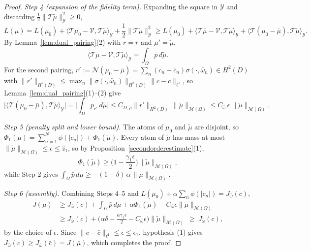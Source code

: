 \documentclass[11pt]{amsart}
\theoremstyle{definition}
\theoremstyle{remark}
\begin{document}
\begin{proof}
\emph{Step 4 (expansion of the fidelity term).} Expanding the square in
$\mathcal{Y}$ and discarding $\frac{1}{2}\|\mathcal{T}\tilde{\mu}\|_{\mathcal{Y}}^2 \ge 0$,
\begin{equation*}
	L(\mu)
	= L(\mu_0) + \langle \mathcal{T}\mu_0 - \mathcal{V}, \mathcal{T}\tilde{\mu} \rangle_{\mathcal{Y}}
	+ \frac{1}{2}\|\mathcal{T}\tilde{\mu}\|_{\mathcal{Y}}^2
	\ge L(\mu_0)
	+ \langle \mathcal{T}\bar{\mu} - \mathcal{V}, \mathcal{T}\tilde{\mu} \rangle_{\mathcal{Y}}
	+ \langle \mathcal{T}(\mu_0 - \bar{\mu}), \mathcal{T}\tilde{\mu} \rangle_{\mathcal{Y}} .
\end{equation*}
By Lemma~\ref{lem:dual_pairing}(2) with $r = \bar{r}$ and $\mu' = \tilde{\mu}$,
\begin{equation*}
	\langle \mathcal{T}\bar{\mu} - \mathcal{V}, \mathcal{T}\tilde{\mu} \rangle_{\mathcal{Y}}
	= \int_\Omega \bar{p} \, d\tilde{\mu} .
\end{equation*}
For the second pairing, $r' := \mathcal{N}(\mu_0 - \bar{\mu})
= \sum_n (c_n - \bar{c}_n) \sigma(\cdot, \bar{\omega}_n) \in H^2(D)$ with
$\|r'\|_{H^2(D)} \le \max_n \|\sigma(\cdot,\bar{\omega}_n)\|_{H^2(D)}
\|c - \bar{c}\|_{\ell^1}$, so Lemma~\ref{lem:dual_pairing}(1)--(2) give
\begin{equation*}
	\big| \langle \mathcal{T}(\mu_0 - \bar{\mu}), \mathcal{T}\tilde{\mu} \rangle_{\mathcal{Y}} \big|
	= \bigg| \int_\Omega p_{r'} \, d\tilde{\mu} \bigg|
	\le C_{D, \rho} \|r'\|_{H^2(D)} \, \|\tilde{\mu}\|_{\mathcal{M}(\Omega)}
	\le C_{\bar{\omega}} \, \epsilon \, \|\tilde{\mu}\|_{\mathcal{M}(\Omega)} .
\end{equation*}

\emph{Step 5 (penalty split and lower bound).} The atoms of $\mu_0$ and
$\tilde{\mu}$ are disjoint, so
$\Phi_1(\mu) = \sum_{n = 1}^N \phi(|c_n|) + \Phi_1(\tilde{\mu})$. Every atom of
$\tilde{\mu}$ has mass at most $\|\tilde{\mu}\|_{\mathcal{M}(\Omega)} \le
\epsilon \le \hat{z}_1$, so by Proposition~\ref{secondorderestimate}(1),
\begin{equation*}
	\Phi_1(\tilde{\mu}) \ge \Big(1 - \frac{\gamma_1 \epsilon}{2}\Big)
	\|\tilde{\mu}\|_{\mathcal{M}(\Omega)} ,
\end{equation*}
while Step 2 gives $\int_\Omega \bar{p}\, d\tilde{\mu} \ge -(1 - \delta)\,
\alpha \, \|\tilde{\mu}\|_{\mathcal{M}(\Omega)}$.

\emph{Step 6 (assembly).} Combining Steps 4--5 and
$L(\mu_0) + \alpha \sum_n \phi(|c_n|) = J_{\bar{\omega}}(c)$,
\begin{align*}
	J(\mu)
	&\ge J_{\bar{\omega}}(c)
	+ \int_\Omega \bar{p}\, d\tilde{\mu}
	+ \alpha \Phi_1(\tilde{\mu})
	- C_{\bar{\omega}} \epsilon \|\tilde{\mu}\|_{\mathcal{M}(\Omega)} \\
	&\ge J_{\bar{\omega}}(c)
	+ \Big( \alpha \delta - \frac{\alpha \gamma_1 \epsilon}{2}
	- C_{\bar{\omega}} \epsilon \Big) \|\tilde{\mu}\|_{\mathcal{M}(\Omega)}
	\ \ge \ J_{\bar{\omega}}(c),
\end{align*}
by the choice of $\epsilon$. Since $\|c - \bar{c}\|_{\ell^1} \le \epsilon \le
\epsilon_1$, hypothesis (1) gives $J_{\bar{\omega}}(c) \ge
J_{\bar{\omega}}(\bar{c}) = J(\bar{\mu})$, which completes the proof.
\end{proof}
\end{document}
